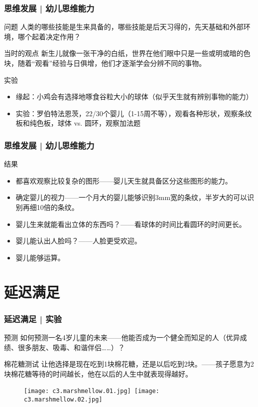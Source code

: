 \begin{frame}
  \frametitle{思维发展 | 幼儿思维能力}
  \begin{block}{问题}
    人类的哪些技能是生来具备的，哪些技能是后天习得的，先天基础和外部环境，哪个起着决定作用？
  \end{block}
  \pause
  \begin{block}{当时的观点}
    新生儿就像一张干净的白纸，世界在他们眼中只是一些或明或暗的色块，随着“观看”经验与日俱增，他们才逐渐学会分辨不同的事物。
  \end{block}
  \pause
  \begin{block}{实验}
    \begin{itemize}
      \item 缘起：小鸡会有选择地啄食谷粒大小的球体（似乎天生就有辨别事物的能力）
      \item 实验：罗伯特\textbullet 法恩茨，22/30个婴儿（1-15周不等），观看各种形状，观察条纹板和纯色板，球体 vs. 圆环，观察加法题
    \end{itemize}
  \end{block}
\end{frame}

\begin{frame}
  \frametitle{思维发展 | 幼儿思维能力}
  \begin{block}{结果}
    \begin{itemize}
      \item 都喜欢观察比较复杂的图形——婴儿天生就具备区分这些图形的能力。
      \item 确定婴儿的视力——一个月大的婴儿能够识别3mm宽的条纹，半岁大的可以识别再细10倍的条纹。
      \item 婴儿生来就能看出立体的东西吗？——看球体的时间比看圆环的时间更长。
      \item 婴儿能认出人脸吗？——人脸更受欢迎。
      \item 婴儿能够运算。
    \end{itemize}
  \end{block}
\end{frame}

\section{延迟满足}
\begin{frame}
  \frametitle{延迟满足 | 实验}
  \begin{block}{预测}
    如何预测一名4岁儿童的未来——他能否成为一个健全而知足的人（优异成绩、很多朋友、吸毒、和谐伴侣……）？
  \end{block}
  \pause
  \begin{block}{棉花糖测试}
    让他选择是现在吃到1块棉花糖，还是以后吃到2块。——孩子愿意为2块棉花糖等待的时间越长，他在以后的人生中就表现得越好。
    \vspace{-1em}
    \begin{figure}
      \centering
      \texttt{[image: c3.marshmellow.01.jpg]}\ 
      \texttt{[image: c3.marshmellow.02.jpg]}
    \end{figure}
  \end{block}
\end{frame}

